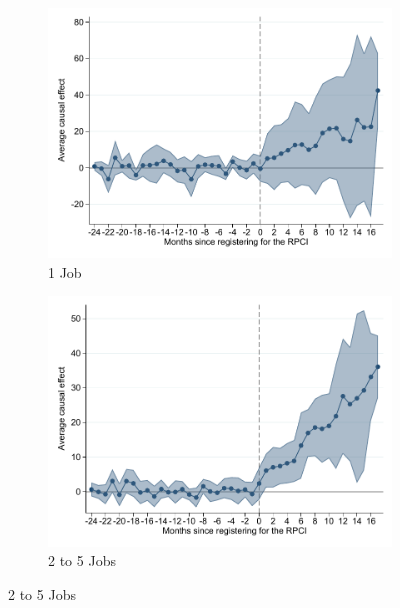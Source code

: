 \documentclass[oneside,11pt]{article}
\begin{document}
\begin{figure}[H]
    \caption{Event studies - RPCI effect on wage by firm size}
    \label{event_study_wage_firm_size}
    \begin{center}
    
    \begin{subfigure}{0.49\textwidth}
    \caption{1 Job}
    \includegraphics[width=\textwidth]{04_Figures/muestra_10porciento/event_study_sal_cierre_chaisemartin_firm_size_1.pdf}
    \end{subfigure}
    \begin{subfigure}{0.49\textwidth}
    \caption{2 to 5 Jobs}
    \includegraphics[width=\textwidth]{04_Figures/muestra_10porciento/event_study_sal_cierre_chaisemartin_firm_size_2.pdf}
    \end{subfigure}
    

\end{center}
\end{figure}
\end{document}
